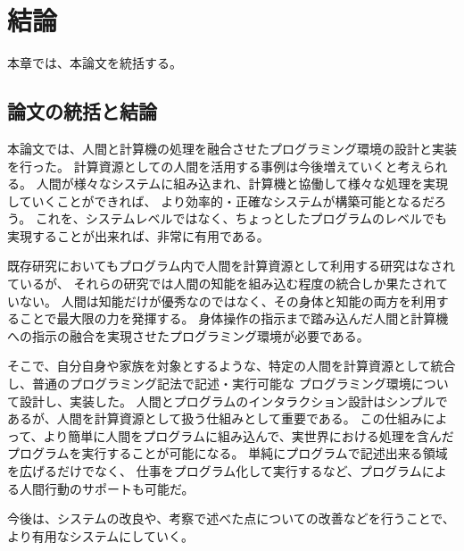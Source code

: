 \chapter{結論}\label{chap:conclusion}

本章では、本論文を統括する。

\section{論文の統括と結論}\label{ux8ad6ux6587ux306eux7d71ux62ecux3068ux7d50ux8ad6}

本論文では、人間と計算機の処理を融合させたプログラミング環境の設計と実装を行った。
計算資源としての人間を活用する事例は今後増えていくと考えられる。
人間が様々なシステムに組み込まれ、計算機と協働して様々な処理を実現していくことができれば、
より効率的・正確なシステムが構築可能となるだろう。
これを、システムレベルではなく、ちょっとしたプログラムのレベルでも実現することが出来れば、非常に有用である。

既存研究においてもプログラム内で人間を計算資源として利用する研究はなされているが、
それらの研究では人間の知能を組み込む程度の統合しか果たされていない。
人間は知能だけが優秀なのではなく、その身体と知能の両方を利用することで最大限の力を発揮する。
身体操作の指示まで踏み込んだ人間と計算機への指示の融合を実現させたプログラミング環境が必要である。

そこで、自分自身や家族を対象とするような、特定の人間を計算資源として統合し、普通のプログラミング記法で記述・実行可能な
プログラミング環境について設計し、実装した。
人間とプログラムのインタラクション設計はシンプルであるが、人間を計算資源として扱う仕組みとして重要である。
この仕組みによって、より簡単に人間をプログラムに組み込んで、実世界における処理を含んだプログラムを実行することが可能になる。
単純にプログラムで記述出来る領域を広げるだけでなく、
仕事をプログラム化して実行するなど、プログラムによる人間行動のサポートも可能だ。

今後は、システムの改良や、考察で述べた点についての改善などを行うことで、
より有用なシステムにしていく。
